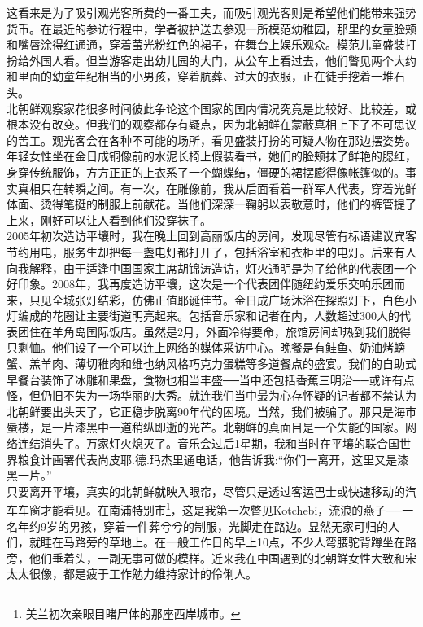 这看来是为了吸引观光客所费的一番工夫，而吸引观光客则是希望他们能带来强势货币。在最近的参访行程中，学者被护送去参观一所模范幼稚园，那里的女童脸颊和嘴唇涂得红通通，穿着萤光粉红色的裙子，在舞台上娱乐观众。模范儿童盛装打扮给外国人看。但当游客走出幼儿园的大门，从公车上看过去，他们瞥见两个大约和里面的幼童年纪相当的小男孩，穿着肮葬、过大的衣服，正在徒手挖着一堆石头。\\

北朝鲜观察家花很多时间彼此争论这个国家的国内情况究竟是比较好、比较差，或根本没有改变。但我们的观察都存有疑点，因为北朝鲜在蒙蔽真相上下了不可思议的苦工。观光客会在各种不可能的场所，看见盛装打扮的可疑人物在那边摆姿势。年轻女性坐在金日成铜像前的水泥长椅上假装看书，她们的脸颊抹了鲜艳的腮红，身穿传统服饰，方方正正的上衣系了一个蝴蝶结，僵硬的裙摆膨得像帐篷似的。事实真相只在转瞬之间。有一次，在雕像前，我从后面看着一群军人代表，穿着光鲜体面、烫得笔挺的制服上前献花。当他们深深一鞠躬以表敬意时，他们的裤管提了上来，刚好可以让人看到他们没穿袜子。\\

2005年初次造访平壤时，我在晚上回到高丽饭店的房间，发现尽管有标语建议宾客节约用电，服务生却把每一盏电灯都打开了，包括浴室和衣柜里的电灯。后来有人向我解释，由于适逢中国国家主席胡锦涛造访，灯火通明是为了给他的代表团一个好印象。2008年，我再度造访平壤，这次是一个代表团伴随纽约爱乐交响乐团而来，只见全城张灯结彩，仿佛正值耶诞佳节。金日成广场沐浴在探照灯下，白色小灯编成的花圈让主要街道明亮起来。包括音乐家和记者在内，人数超过300人的代表团住在羊角岛国际饭店。虽然是2月，外面冷得要命，旅馆房间却热到我们脱得只剩恤。他们设了一个可以连上网络的媒体采访中心。晚餐是有鲑鱼、奶油烤螃蟹、羔羊肉、薄切稚肉和维也纳风格巧克力蛋糕等多道餐点的盛宴。我们的自助式早餐台装饰了冰雕和果盘，食物也相当丰盛──当中还包括香蕉三明治──或许有点怪，但仍旧不失为一场华丽的大秀。就连我们当中最为心存怀疑的记者都不禁认为北朝鲜要出头天了，它正稳步脱离90年代的困境。当然，我们被骗了。那只是海市蜃楼，是一片漆黑中一道稍纵即逝的光芒。北朝鲜的真面目是一个失能的国家。网络连结消失了。万家灯火熄灭了。音乐会过后1星期，我和当时在平壤的联合国世界粮食计画署代表尚皮耶.德.玛杰里通电话，他告诉我:“你们一离开，这里又是漆黑一片。”\\

只要离开平壤，真实的北朝鲜就映入眼帘，尽管只是透过客运巴士或快速移动的汽车车窗才能看见。在南浦特别市\footnote{美兰初次亲眼目睹尸体的那座西岸城市。}，这是我第一次瞥见Kotchebi，流浪的燕子──一名年约9岁的男孩，穿着一件葬兮兮的制服，光脚走在路边。显然无家可归的人们，就睡在马路旁的草地上。在一般工作日的早上10点，不少人弯腰驼背蹲坐在路旁，他们垂着头，一副无事可做的模样。近来我在中国遇到的北朝鲜女性大致和宋太太很像，都是疲于工作勉力维持家计的伶俐人。\\

